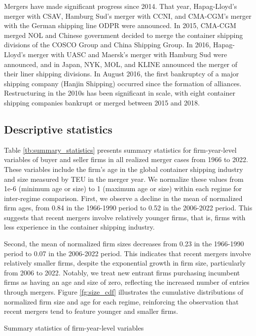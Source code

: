 \documentclass[10pt]{article}
\begin{document}
Mergers have made significant progress since 2014. 
That year, Hapag-Lloyd's merger with CSAV, Hamburg Sud's merger with CCNI, and CMA-CGM's merger with the German shipping line ODPR were announced.
In 2015, CMA-CGM merged NOL and Chinese government decided to merge the container shipping divisions of the COSCO Group and China Shipping Group.
In 2016, Hapag-Lloyd's merger with UASC and Maersk's merger with Hamburg Sud were announced, and in Japan, NYK, MOL, and KLINE announced the merger of their liner shipping divisions.
In August 2016, the first bankruptcy of a major shipping company (Hanjin Shipping) occurred since the formation of alliances.
Restructuring in the 2010s has been significant in scale, with eight container shipping companies bankrupt or merged between 2015 and 2018.


\subsection{Descriptive statistics}\label{sec:descriptive_statistics}

Table \ref{tb:summary_statistics} presents summary statistics for firm-year-level variables of buyer and seller firms in all realized merger cases from 1966 to 2022. 
These variables include the firm's age in the global container shipping industry and size measured by TEU in the merger year. 
We normalize these values from 1e-6 (minimum age or size) to 1 (maximum age or size) within each regime for inter-regime comparison.
First, we observe a decline in the mean of normalized firm ages, from 0.84 in the 1966-1990 period to 0.52 in the 2006-2022 period. 
This suggests that recent mergers involve relatively younger firms, that is, firms with less experience in the container shipping industry.

Second, the mean of normalized firm sizes decreases from 0.23 in the 1966-1990 period to 0.07 in the 2006-2022 period.
This indicates that recent mergers involve relatively smaller firms, despite the exponential growth in firm size, particularly from 2006 to 2022.
Notably, we treat new entrant firms purchasing incumbent firms as having an age and size of zero, reflecting the increased number of entries through mergers.
Figure \ref{fg:size_cdf} illustrates the cumulative distributions of normalized firm size and age for each regime, reinforcing the observation that recent mergers tend to feature younger and smaller firms.


\begin{table}[!htbp]
  \begin{center}
      \caption{Summary statistics of firm-year-level variables}
      \label{tb:summary_statistics} 
      \subfloat[CIY (1966-1990)]{}\\
      \subfloat[IHS (1991-2005)]{}\\
      \subfloat[HB (2006-2022)]{}
      
  \end{center}\footnotesize
\end{table} 
\end{document}
